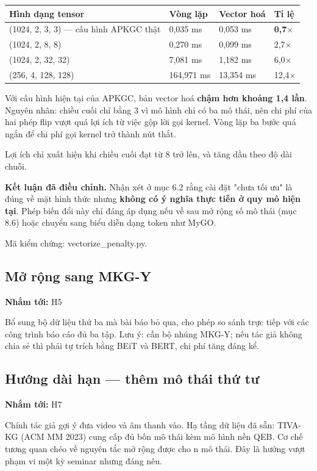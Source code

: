 \documentclass[11pt,a4paper]{article}
\newcommand{\code}[1]{{\ttfamily\small\color{codetext}#1}}
\begin{document}
\begin{center}\small
\begin{tabular}{@{}llll@{}}
\toprule
\textbf{Hình dạng tensor} & \textbf{Vòng lặp} & \textbf{Vector hoá} & \textbf{Tỉ lệ}\\
\midrule
(1024, 2, 3, 3) --- cấu hình APKGC thật & 0,035 ms & 0,053 ms & \textbf{0,7$\times$}\\
(1024, 2, 8, 8) & 0,270 ms & 0,099 ms & 2,7$\times$\\
(1024, 2, 32, 32) & 7,081 ms & 1,182 ms & 6,0$\times$\\
(256, 4, 128, 128) & 164,971 ms & 13,354 ms & 12,4$\times$\\
\bottomrule
\end{tabular}
\end{center}
Với cấu hình hiện tại của APKGC, bản vector hoá \textbf{chậm hơn khoảng 1,4 lần}. Nguyên nhân: chiều cuối chỉ bằng 3 vì mô hình chỉ có ba mô thái, nên chi phí của hai phép \code{flip} vượt quá lợi ích từ việc gộp lời gọi kernel. Vòng lặp ba bước quá ngắn để chi phí gọi kernel trở thành nút thắt.

Lợi ích chỉ xuất hiện khi chiều cuối đạt từ 8 trở lên, và tăng dần theo độ dài chuỗi.

\textbf{Kết luận đã điều chỉnh.} Nhận xét ở mục 6.2 rằng cài đặt "chưa tối ưu" là đúng về mặt hình thức nhưng \textbf{không có ý nghĩa thực tiễn ở quy mô hiện tại}. Phép biến đổi này chỉ đáng áp dụng nếu về sau mở rộng số mô thái (mục 8.6) hoặc chuyển sang biểu diễn dạng token như MyGO.

Mã kiểm chứng: \code{vectorize\_penalty.py}.

\subsection{Mở rộng sang MKG-Y}
\textbf{Nhắm tới:} H5

Bổ sung bộ dữ liệu thứ ba mà bài báo bỏ qua, cho phép so sánh trực tiếp với các công trình báo cáo đủ ba tập. Lưu ý: cần bộ nhúng MKG-Y; nếu tác giả không chia sẻ thì phải tự trích bằng BEiT và BERT, chi phí tăng đáng kể.

\subsection{Hướng dài hạn --- thêm mô thái thứ tư}
\textbf{Nhắm tới:} H7

Chính tác giả gợi ý đưa video và âm thanh vào. Hạ tầng dữ liệu đã sẵn: TIVA-KG (ACM MM 2023) cung cấp đủ bốn mô thái kèm mô hình nền QEB. Cơ chế tương quan chéo về nguyên tắc mở rộng được cho n mô thái. Đây là hướng vượt phạm vi một kỳ seminar nhưng đáng nêu.
\end{document}
